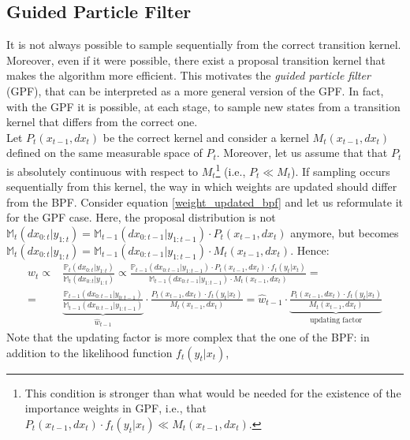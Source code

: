 \documentclass[
]{book}
\theoremstyle{break}
\theoremstyle{nonumberplain}
\begin{document}
\subsection{Guided Particle Filter}

It is not always possible to sample sequentially from the correct
transition kernel. Moreover, even if it were possible, there exist a
proposal transition kernel that makes the algorithm more efficient. This
motivates the \textit{guided particle filter} (GPF), that can be
interpreted as a more general version of the GPF. In fact, with the GPF
it is possible, at each stage, to sample new states from a transition
kernel that differs from the correct one.~\\
Let \(P_t(x_{t-1},dx_t)\) be the correct kernel and consider a kernel
\(M_t(x_{t-1},dx_t)\) defined on the same measurable space of \(P_t\).
Moreover, let us assume that that \(P_t\) is absolutely continuous with
respect to
\(M_t\)\footnote{This condition is stronger than what would be needed for the existence of the importance weights in GPF, i.e., that  $P_t(x_{t-1},dx_t)\cdot f_t(y_t|x_t)\ll M_t(x_{t-1},dx_t)$. }
(i.e., \(P_t\ll M_t\)). If sampling occurs sequentially from this
kernel, the way in which weights are updated should differ from the BPF.
Consider equation \eqref{weight_updated_bpf} and let us reformulate it
for the GPF case. Here, the proposal distribution is not
\(\mathbb M_t(dx_{0:t}|y_{1:t})=\mathbb M_{t-1}(dx_{0:t-1}|y_{1:t-1})\cdot P_t(x_{t-1},dx_t)\)
anymore, but becomes
\(\mathbb M_t(dx_{0:t}|y_{1:t})=\mathbb M_{t-1}(dx_{0:t-1}|y_{1:t-1})\cdot M_t(x_{t-1},dx_t)\).
Hence: \begin{equation}
    \begin{split}
        w_t\propto&\frac{\mathbb P_t(dx_{0:t}|y_{1:t})}{\mathbb M_t(dx_{0:t}|y_{1:t})}\propto \frac{\mathbb P_{t-1}(dx_{0:t-1}|y_{1:t-1})\cdot P_t(x_{t-1},dx_t)\cdot f_t(y_t|x_t)}{\mathbb M_{t-1}(dx_{0:t-1}|y_{1:t-1})\cdot M_t(x_{t-1},dx_t)}=\\
        =&\underbrace{\frac{\mathbb P_{t-1}(dx_{0:t-1}|y_{0:t-1})}{\mathbb M_{t-1}(dx_{0:t-1}|y_{1:t-1})}}_{\hat w_{t-1}}\cdot\frac{P_t(x_{t-1},dx_t)\cdot f_t(y_t|x_t)}{ M_t(x_{t-1},dx_t)} =\hat w_{t-1}\cdot\underbrace{\frac{P_t(x_{t-1},dx_t)\cdot f_t(y_t|x_t)}{ M_t(x_{t-1},dx_t)}}_{\text{updating factor}}
    \end{split}\label{weight_updated_gpf}
\end{equation} Note that the updating factor is more complex that the
one of the BPF: in addition to the likelihood function \(f_t(y_t|x_t)\),
\end{document}
